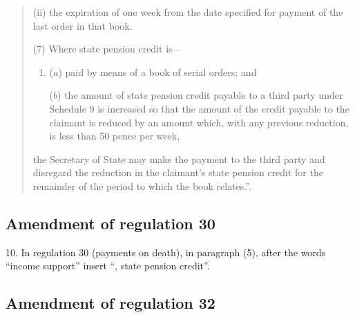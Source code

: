 \documentclass[12pt,a4paper]{article}
\begin{document}
\begin{quotation}
\begin{enumerate}
(ii) the expiration of one week from the date specified for payment of the last order in that book.
\end{enumerate}

(7) Where state pension credit is—
\begin{enumerate}\item[]
($a$) paid by means of a book of serial orders; and

($b$) the amount of state pension credit payable to a third party under Schedule 9 is increased so that the amount of the credit payable to the claimant is reduced by an amount which, with any previous reduction, is less than 50 pence per week,
\end{enumerate}
the Secretary of State may make the payment to the third party and disregard the reduction in the claimant’s state pension credit for the remainder of the period to which the book relates.”.
\end{quotation}

\subsection[10. Amendment of regulation 30]{Amendment of regulation 30}

10.  In regulation 30 (payments on death), in paragraph (5), after the words “income support” insert “, state pension credit”.

\subsection[11. Amendment of regulation 32]{Amendment of regulation 32}
\end{document}
